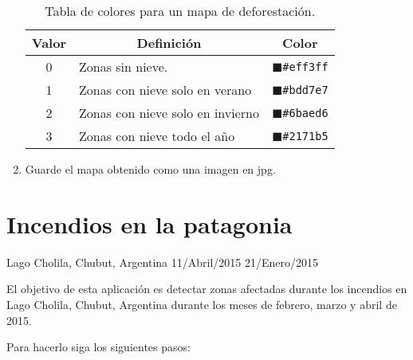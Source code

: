 \begin{enumerate}
\begin{table}[]
\centering
\begin{tabular}{@{}cll@{}}
\toprule
Valor  & \multicolumn{1}{c}{Definición}   & \multicolumn{1}{c}{Color}                       \\ \midrule
0      & Zonas sin nieve.                 & \textcolor{N1}{$\blacksquare$}\texttt{\#eff3ff} \\
1      & Zonas con nieve solo en verano   & \textcolor{N2}{$\blacksquare$}\texttt{\#bdd7e7} \\
2      & Zonas con nieve solo en invierno & \textcolor{N3}{$\blacksquare$}\texttt{\#6baed6} \\
3      & Zonas con nieve todo el año      & \textcolor{N4}{$\blacksquare$}\texttt{\#2171b5} \\ \bottomrule
\end{tabular}
\caption{Tabla de colores para un mapa de deforestación.}
\label{tab:nieve}
\end{table}

\item Guarde el mapa obtenido como una imagen en jpg.
\end{enumerate}

\section{Incendios en la patagonia}

Lago Cholila, Chubut, Argentina
11/Abril/2015
21/Enero/2015

El objetivo de esta aplicación es detectar zonas afectadas durante los incendios en Lago Cholila, Chubut, Argentina durante los meses de febrero, marzo y abril de 2015.

Para hacerlo siga los siguientes pasos:

